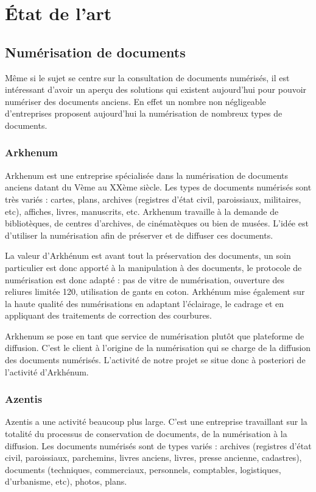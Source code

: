 \section{État de l'art}
\label{sec:etat_art}

    \subsection{Numérisation de documents}
    \label{subsec:numerisation}
    Même si le sujet se centre sur la consultation de documents numérisés, il est intéressant d’avoir un aperçu des solutions
    qui existent aujourd’hui pour pouvoir numériser des documents anciens. En effet un nombre non négligeable d’entreprises
    proposent aujourd’hui la numérisation de nombreux types de documents.

        \subsubsection{Arkhenum}
        \label{subsubsec:arkhenum}
        Arkhenum est une entreprise spécialisée dans la numérisation de documents anciens datant du Vème au XXème siècle.
        Les types de documents numérisés sont très variés : cartes, plans, archives (registres d'état civil, paroissiaux,
        militaires, etc), affiches, livres, manuscrits, etc. Arkhenum travaille à la demande de bibliotèques, de centres d'archives,
        de cinématèques ou bien de musées. L'idée est d'utiliser la numérisation afin de préserver et de diffuser ces documents.

        La valeur d'Arkhénum est avant tout la préservation des documents, un soin particulier est donc apporté à la manipulation
        à des documents, le protocole de numérisation est donc adapté : pas de vitre de numérisation, ouverture des reliures limitée
        120\degree, utilisation de gants en coton. Arkhénum mise également sur la haute qualité des numérisations en adaptant l'éclairage,
        le cadrage et en appliquant des traitements de correction des courbures.

        Arkhenum se pose en tant que service de numérisation plutôt que plateforme de diffusion. C’est le client à l’origine de la
        numérisation qui se charge de la diffusion des documents numérisés. L'activité de notre projet se situe donc à posteriori de l'activité d'Arkhénum.

        \subsubsection{Azentis}
        \label{subsubsec:azentis}
        Azentis a une activité beaucoup plus large. C’est une entreprise travaillant sur la totalité du processus de conservation de documents,
        de la  numérisation à la diffusion. Les documents numérisés sont de types variés : archives (registres d'état civil, paroissiaux,
        parchemins, livres anciens, livres, presse ancienne, cadastres), documents (techniques, commerciaux, personnels, comptables, logistiques,
        d'urbanisme, etc), photos, plans.

